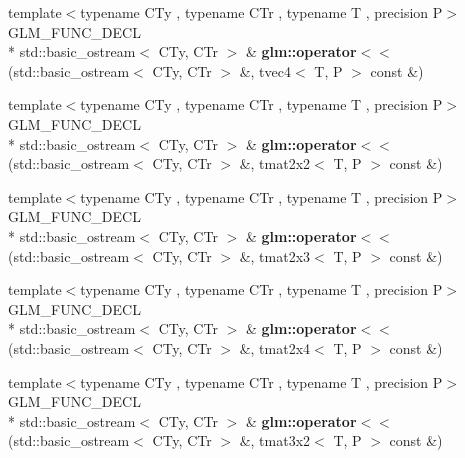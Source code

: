 \begin{DoxyCompactItemize}
\item 
\hypertarget{group__gtx__io_ga948ab426a879f24236d8978ee9b5fade}{{\footnotesize template$<$typename C\-Ty , typename C\-Tr , typename T , precision P$>$ }\\G\-L\-M\-\_\-\-F\-U\-N\-C\-\_\-\-D\-E\-C\-L \\*
std\-::basic\-\_\-ostream$<$ C\-Ty, C\-Tr $>$ \& {\bfseries glm\-::operator$<$$<$} (std\-::basic\-\_\-ostream$<$ C\-Ty, C\-Tr $>$ \&, tvec4$<$ T, P $>$ const \&)}\label{group__gtx__io_ga948ab426a879f24236d8978ee9b5fade}

\item 
\hypertarget{group__gtx__io_ga61fbdb6ad70c4c8d750a847251fa4a4a}{{\footnotesize template$<$typename C\-Ty , typename C\-Tr , typename T , precision P$>$ }\\G\-L\-M\-\_\-\-F\-U\-N\-C\-\_\-\-D\-E\-C\-L \\*
std\-::basic\-\_\-ostream$<$ C\-Ty, C\-Tr $>$ \& {\bfseries glm\-::operator$<$$<$} (std\-::basic\-\_\-ostream$<$ C\-Ty, C\-Tr $>$ \&, tmat2x2$<$ T, P $>$ const \&)}\label{group__gtx__io_ga61fbdb6ad70c4c8d750a847251fa4a4a}

\item 
\hypertarget{group__gtx__io_ga032043616f87c7eefaf4d83a20f779a5}{{\footnotesize template$<$typename C\-Ty , typename C\-Tr , typename T , precision P$>$ }\\G\-L\-M\-\_\-\-F\-U\-N\-C\-\_\-\-D\-E\-C\-L \\*
std\-::basic\-\_\-ostream$<$ C\-Ty, C\-Tr $>$ \& {\bfseries glm\-::operator$<$$<$} (std\-::basic\-\_\-ostream$<$ C\-Ty, C\-Tr $>$ \&, tmat2x3$<$ T, P $>$ const \&)}\label{group__gtx__io_ga032043616f87c7eefaf4d83a20f779a5}

\item 
\hypertarget{group__gtx__io_ga1a2314cab31da0e736bc5e601bcb8f37}{{\footnotesize template$<$typename C\-Ty , typename C\-Tr , typename T , precision P$>$ }\\G\-L\-M\-\_\-\-F\-U\-N\-C\-\_\-\-D\-E\-C\-L \\*
std\-::basic\-\_\-ostream$<$ C\-Ty, C\-Tr $>$ \& {\bfseries glm\-::operator$<$$<$} (std\-::basic\-\_\-ostream$<$ C\-Ty, C\-Tr $>$ \&, tmat2x4$<$ T, P $>$ const \&)}\label{group__gtx__io_ga1a2314cab31da0e736bc5e601bcb8f37}

\item 
\hypertarget{group__gtx__io_gac825ec168ada9209dad314bca460ceef}{{\footnotesize template$<$typename C\-Ty , typename C\-Tr , typename T , precision P$>$ }\\G\-L\-M\-\_\-\-F\-U\-N\-C\-\_\-\-D\-E\-C\-L \\*
std\-::basic\-\_\-ostream$<$ C\-Ty, C\-Tr $>$ \& {\bfseries glm\-::operator$<$$<$} (std\-::basic\-\_\-ostream$<$ C\-Ty, C\-Tr $>$ \&, tmat3x2$<$ T, P $>$ const \&)}\label{group__gtx__io_gac825ec168ada9209dad314bca460ceef}


\end{DoxyCompactItemize}
